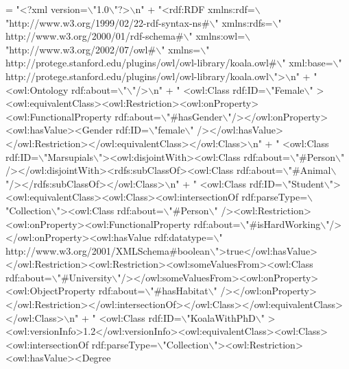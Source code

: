 \begin{DoxyCode}
= \textcolor{stringliteral}{"<?xml version=\(\backslash\)"1.0\(\backslash\)"?>\(\backslash\)n"}
            + \textcolor{stringliteral}{"<rdf:RDF xmlns:rdf=\(\backslash\)"http://www.w3.org/1999/02/22-rdf-syntax-ns#\(\backslash\)" xmlns:rdfs=\(\backslash\)"
      http://www.w3.org/2000/01/rdf-schema#\(\backslash\)" xmlns:owl=\(\backslash\)"http://www.w3.org/2002/07/owl#\(\backslash\)" xmlns=\(\backslash\)"
      http://protege.stanford.edu/plugins/owl/owl-library/koala.owl#\(\backslash\)" xml:base=\(\backslash\)"
      http://protege.stanford.edu/plugins/owl/owl-library/koala.owl\(\backslash\)">\(\backslash\)n"}
            + \textcolor{stringliteral}{"  <owl:Ontology rdf:about=\(\backslash\)"\(\backslash\)"/>\(\backslash\)n"}
            + \textcolor{stringliteral}{"  <owl:Class rdf:ID=\(\backslash\)"Female\(\backslash\)"
      ><owl:equivalentClass><owl:Restriction><owl:onProperty><owl:FunctionalProperty rdf:about=\(\backslash\)"#hasGender\(\backslash\)"/></owl:onProperty><owl:hasValue><Gender rdf:ID=\(\backslash\)"female\(\backslash\)"
      /></owl:hasValue></owl:Restriction></owl:equivalentClass></owl:Class>\(\backslash\)n"}
            + \textcolor{stringliteral}{"  <owl:Class rdf:ID=\(\backslash\)"Marsupials\(\backslash\)"><owl:disjointWith><owl:Class rdf:about=\(\backslash\)"#Person\(\backslash\)"
      /></owl:disjointWith><rdfs:subClassOf><owl:Class rdf:about=\(\backslash\)"#Animal\(\backslash\)"/></rdfs:subClassOf></owl:Class>\(\backslash\)n"}
            + \textcolor{stringliteral}{"  <owl:Class rdf:ID=\(\backslash\)"Student\(\backslash\)"><owl:equivalentClass><owl:Class><owl:intersectionOf
       rdf:parseType=\(\backslash\)"Collection\(\backslash\)"><owl:Class rdf:about=\(\backslash\)"#Person\(\backslash\)"
      /><owl:Restriction><owl:onProperty><owl:FunctionalProperty rdf:about=\(\backslash\)"#isHardWorking\(\backslash\)"/></owl:onProperty><owl:hasValue rdf:datatype=\(\backslash\)"
      http://www.w3.org/2001/XMLSchema#boolean\(\backslash\)">true</owl:hasValue></owl:Restriction><owl:Restriction><owl:someValuesFrom><owl:Class
       rdf:about=\(\backslash\)"#University\(\backslash\)"/></owl:someValuesFrom><owl:onProperty><owl:ObjectProperty rdf:about=\(\backslash\)"#hasHabitat\(\backslash\)"
      /></owl:onProperty></owl:Restriction></owl:intersectionOf></owl:Class></owl:equivalentClass></owl:Class>\(\backslash\)n"}
            + \textcolor{stringliteral}{"  <owl:Class rdf:ID=\(\backslash\)"KoalaWithPhD\(\backslash\)"
      ><owl:versionInfo>1.2</owl:versionInfo><owl:equivalentClass><owl:Class><owl:intersectionOf rdf:parseType=\(\backslash\)"Collection\(\backslash\)"><owl:Restriction><owl:hasValue><Degree
}
\end{DoxyCode}
